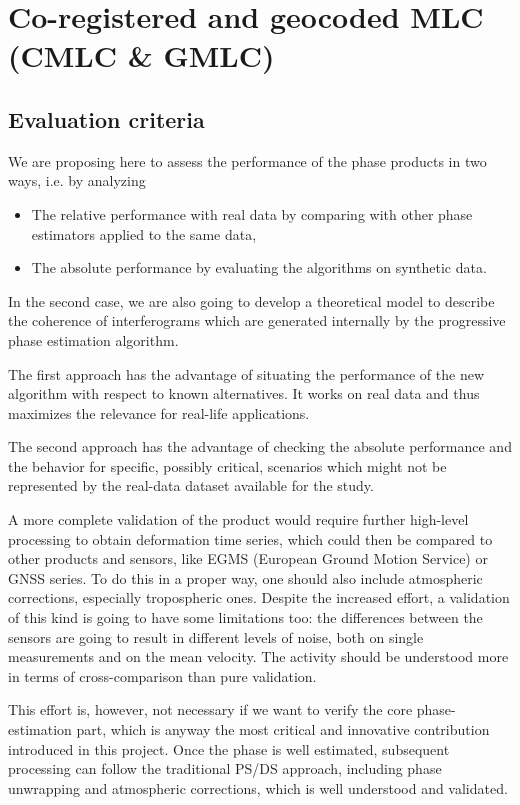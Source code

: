 \section{Co-registered and geocoded MLC (CMLC \& GMLC)}
\label{sec:cmlc}

\subsection{Evaluation criteria}
\label{sec:cmlc_criteria}

We are proposing here to assess the performance of the phase products in two ways, i.e. by analyzing
\begin{itemize}
    \item The relative performance with real data by comparing with other phase estimators applied to the same data,
    \item The absolute performance by evaluating the algorithms on synthetic data.
\end{itemize}
In the second case, we are also going to develop a theoretical model to describe the coherence of interferograms which are generated internally by the progressive phase estimation algorithm.

The first approach has the advantage of situating the performance of the new algorithm with respect to known alternatives. It works on real data and thus maximizes the relevance for real-life applications.

The second approach has the advantage of checking the absolute performance and the behavior for specific, possibly critical, scenarios which might not be represented by the real-data dataset available for the study.

A more complete validation of the product would require further high-level processing to obtain deformation time series, which could then be compared to other products and sensors, like EGMS (European Ground Motion Service) or GNSS series. To do this in a proper way, one should also include atmospheric corrections, especially tropospheric ones. 
Despite the increased effort, a validation of this kind is going to have some limitations too: the differences between the sensors are going to result in different levels of noise, both on single measurements and on the mean velocity.
The activity should be understood more in terms of cross-comparison than pure validation.

This effort is, however, not necessary if we want to verify the core phase-estimation part, which is anyway the most critical and innovative contribution introduced in this project. Once the phase is well estimated, subsequent processing can follow the traditional PS/DS approach, including phase unwrapping and atmospheric corrections, which is well understood and validated.

